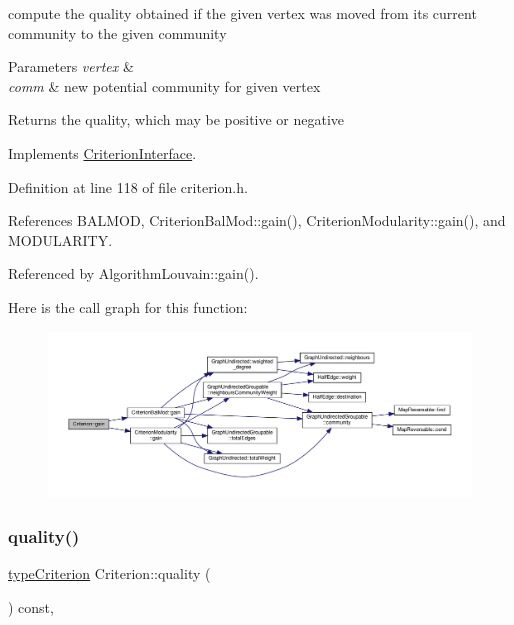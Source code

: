 compute the quality obtained if the given vertex was moved from its current community to the given community


\begin{DoxyParams}{Parameters}
{\em vertex} & \\
\hline
{\em comm} & new potential community for given vertex \\
\hline
\end{DoxyParams}
\begin{DoxyReturn}{Returns}
the quality, which may be positive or negative 
\end{DoxyReturn}


Implements \hyperlink{classCriterionInterface_aa0beec8287cd70e16c057e7995d0caca}{Criterion\+Interface}.



Definition at line 118 of file criterion.\+h.



References B\+A\+L\+M\+OD, Criterion\+Bal\+Mod\+::gain(), Criterion\+Modularity\+::gain(), and M\+O\+D\+U\+L\+A\+R\+I\+TY.



Referenced by Algorithm\+Louvain\+::gain().

Here is the call graph for this function\+:
\nopagebreak
\begin{figure}[H]
\begin{center}
\leavevmode
\includegraphics[width=350pt]{classCriterion_a99e23ddc517ca3f2ea4766a5b4be0e3e_cgraph}
\end{center}
\end{figure}
\mbox{\label{classCriterion_a1f8b3a7bf56b5434b04d5366d754d459}} 
\subsubsection{\texorpdfstring{quality()}{quality()}}
{\footnotesize\ttfamily \hyperlink{criterionInterface_8h_af71ff22f6355fd69a4a62104bfd59a83}{type\+Criterion} Criterion\+::quality (\begin{DoxyParamCaption}{ }\end{DoxyParamCaption}) const\hspace{0.3cm}{\ttfamily [inline]}, {\ttfamily [virtual]}}


